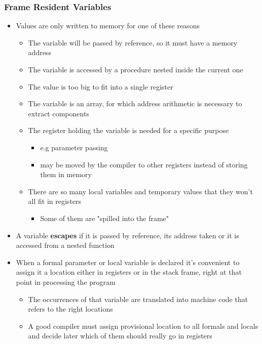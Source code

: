 \documentclass[11pt]{article}
\begin{document}
\subsubsection{Frame Resident Variables}
\label{sec:orgd866d8f}
\begin{itemize}
\item Values are only written to memory for one of these reasons
\begin{itemize}
\item The variable will be passed by reference, so it must have a memory address
\item The variable is accessed by a procedure nested inside the current one
\item The value is too big to fit into a single register
\item The variable is an array, for which address arithmetic is necessary to extract components
\item The register holding the variable is needed for a specific purpose
\begin{itemize}
\item e.g parameter passing
\item may be moved by the compiler to other registers instead of storing them in memory
\end{itemize}
\item There are so many local variables and temporary values that they won't all fit in registers
\begin{itemize}
\item Some of them are "spilled into the frame"
\end{itemize}
\end{itemize}

\item A variable \textbf{escapes} if it is passed by reference, its address taken or it is accessed from a nested function
\item When a formal parameter or local variable is declared it's convenient to assign it a location either in registers or in the stack frame, right at that point in processing the program
\begin{itemize}
\item The occurrences of that variable are translated into machine code that refers to the right locations
\item A good compiler must assign provisional location to all formals and locals and decide later which of them should really go in registers
\end{itemize}
\end{itemize}
\end{document}
